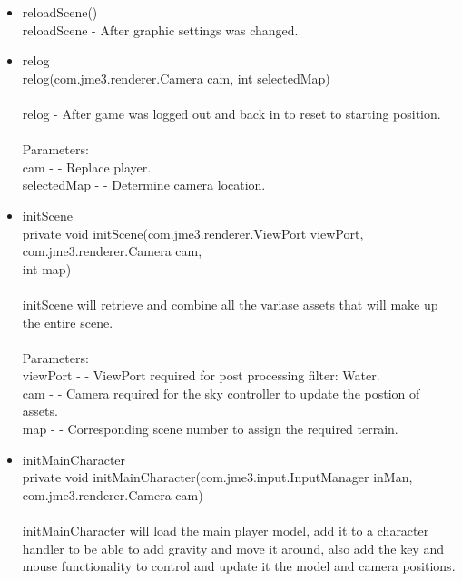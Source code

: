 \documentclass[letterpaper]{article}
\begin{document}
\begin{itemize}
												\begin{itemize}
													\item	reloadScene() \\
															reloadScene - After graphic settings was changed. \\
													\item	relog \\
															relog(com.jme3.renderer.Camera cam, int selectedMap) \\ \\
															relog - After game was logged out and back in to reset to starting position. \\ \\
															Parameters: \\
															cam - - Replace player. \\
															selectedMap - - Determine camera location. \\
													\item	initScene \\
															private void initScene(com.jme3.renderer.ViewPort viewPort,
															             com.jme3.renderer.Camera cam, \\
															             int map) \\ \\
															initScene will retrieve and combine all the variase assets that will make up the entire scene. \\ \\
															Parameters: \\
															viewPort - - ViewPort required for post processing filter: Water. \\
															cam - - Camera required for the sky controller to update the postion of assets. \\
															map - - Corresponding scene number to assign the required terrain. \\
													\item	initMainCharacter \\
															private void initMainCharacter(com.jme3.input.InputManager inMan, \\
															                     com.jme3.renderer.Camera cam) \\ \\
															initMainCharacter will load the main player model, add it to a character handler to be able to add gravity and move it around, also add the key and mouse functionality to control and update it the model and camera positions. \\ \\

\end{itemize}
\end{itemize}
\end{document}
